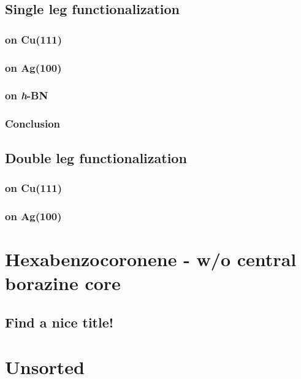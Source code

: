 \documentclass[
10pt,					%
a4paper,				%
twoside,				%
BCOR=8mm,				%
headings=normal,		%
headsepline,			%
footsepline,			%
plainfootsepline,		%
]{scrbook}
\begin{document}
  \section{Single leg functionalization}
   \subsection{on Cu(111)}
      
   \subsection{on Ag(100)}
      
   \subsection{on \textit{h}-BN}
      
	\subsection{Conclusion}
      
  \section{Double leg functionalization}
   \subsection{on Cu(111)}
      
   \subsection{on Ag(100)}
      
\chapter{Hexabenzocoronene - w/o central borazine core}
	\section{Find a nice title!}
		

\chapter{Unsorted}
\end{document}
